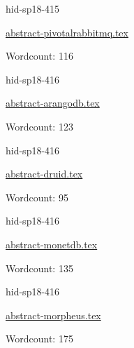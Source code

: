 

\begin{IU}

hid-sp18-415

\href{https://github.com/cloudmesh-community/hid-sp18-415/blob/master//technology/abstract-pivotalrabbitmq.tex}{abstract-pivotalrabbitmq.tex}

 

Wordcount: 116

\end{IU}



\begin{IU}

hid-sp18-416

\href{https://github.com/cloudmesh-community/hid-sp18-416/blob/master//technology/abstract-arangodb.tex}{abstract-arangodb.tex}

 

Wordcount: 123

\end{IU}



\begin{IU}

hid-sp18-416

\href{https://github.com/cloudmesh-community/hid-sp18-416/blob/master//technology/abstract-druid.tex}{abstract-druid.tex}

 

Wordcount: 95

\end{IU}



\begin{IU}

hid-sp18-416

\href{https://github.com/cloudmesh-community/hid-sp18-416/blob/master//technology/abstract-monetdb.tex}{abstract-monetdb.tex}

 

Wordcount: 135

\end{IU}



\begin{IU}

hid-sp18-416

\href{https://github.com/cloudmesh-community/hid-sp18-416/blob/master//technology/abstract-morpheus.tex}{abstract-morpheus.tex}

 

Wordcount: 175

\end{IU}

